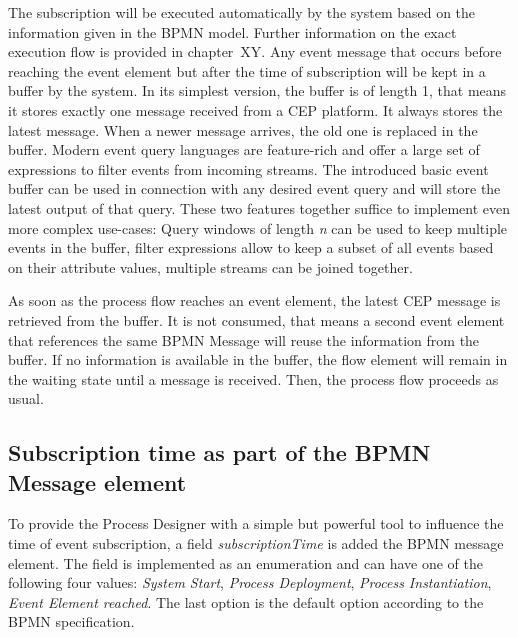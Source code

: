 The subscription will be executed automatically by the system based on the information given in the BPMN model. Further information on the exact execution flow is provided in chapter~XY. 
Any event message that occurs before reaching the event element but after the time of subscription will be kept in a buffer by the system.
In its simplest version, the buffer is of length 1, that means it stores exactly one message received from a CEP platform. It always stores the latest message. When a newer message arrives, the old one is replaced in the buffer.
Modern event query languages are feature-rich and offer a large set of expressions to filter events from incoming streams. 
The introduced basic event buffer can be used in connection with any desired event query and will store the latest output of that query.
These two features together suffice to implement even more complex use-cases: Query windows of length \textit{n} can be used to keep multiple events in the buffer, filter expressions allow to keep a subset of all events based on their attribute values, multiple streams can be joined together.

As soon as the process flow reaches an event element, the latest CEP message is retrieved from the buffer. It is not consumed, that means a second event element that references the same BPMN Message will reuse the information from the buffer.
If no information is available in the buffer, the flow element will remain in the waiting state until a message is received. Then, the process flow proceeds as usual.


\subsection{Subscription time as part of the BPMN Message element}
To provide the Process Designer with a simple but powerful tool to influence the time of event subscription, a field \textit{subscriptionTime} is added the BPMN message element. 
The field is implemented as an enumeration and can have one of the following four values: \textit{System Start}, \textit{Process Deployment}, \textit{Process Instantiation}, \textit{Event Element reached}. The last option is the default option according to the BPMN specification.

